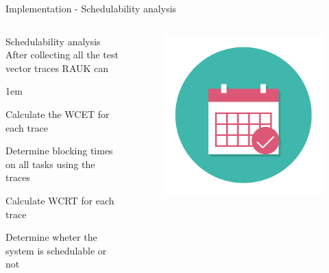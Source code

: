 \begin{frame}{Implementation - Schedulability analysis}
    \begin{columns}
        \begin{block}{Schedulability analysis}
            After collecting all the test vector traces RAUK can
            \begin{itemize-size}{1em}
                \item Calculate the WCET for each trace
                \item Determine blocking times on all tasks using the traces
                \item Calculate WCRT for each trace
                \item Determine wheter the system is schedulable or not
            \end{itemize-size}  
        \end{block}

        \begin{figure}
            \centering
            \includegraphics[scale=0.15]{pictures/schedule.png}
        \end{figure}
    \end{columns}


\end{frame}

